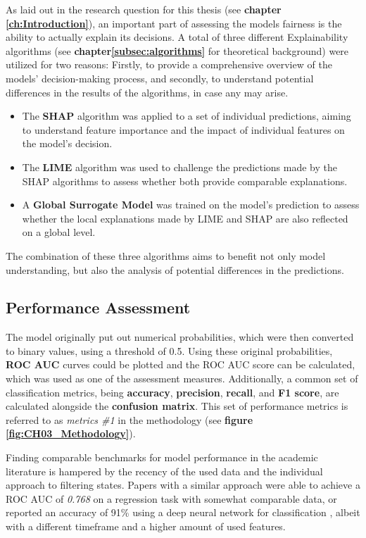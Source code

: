 As laid out in the research question for this thesis (see \textbf{chapter \ref{ch:Introduction}}), an important part of assessing the models fairness is the ability to actually explain its decisions.
A total of three different Explainability algorithms (see \textbf{chapter\ref{subsec:algorithms}} for theoretical background) were utilized for two reasons: Firstly, to provide a comprehensive overview of the models' decision-making process, and secondly, to understand potential differences in the results of the algorithms, in case any may arise.
\begin{itemize}
    \item The \textbf{SHAP} algorithm was applied to a set of individual predictions, aiming to understand feature importance and the impact of individual features on the model's decision.
    \item The \textbf{LIME} algorithm was used to challenge the predictions made by the SHAP algorithms to assess whether both provide comparable explanations.
    \item A \textbf{Global Surrogate Model} was trained on the model's prediction to assess whether the local explanations made by LIME and SHAP are also reflected on a global level.
\end{itemize}
The combination of these three algorithms aims to benefit not only model understanding, but also the analysis of potential differences in the predictions.

\subsection{Performance Assessment}\label{subsec:Performance_Assessment}

The model originally put out numerical probabilities, which were then converted to binary values, using a threshold of 0.5.
Using these original probabilities, \textbf{ROC AUC} curves could be plotted and the ROC AUC score can be calculated, which was used as one of the assessment measures.
Additionally, a common set of classification metrics, being \textbf{accuracy}, \textbf{precision}, \textbf{recall}, and \textbf{F1 score}, are calculated alongside the \textbf{confusion matrix}.
This set of performance metrics is referred to as \textit{metrics \#1} in the methodology (see \textbf{figure \ref{fig:CH03_Methodology}}).

Finding comparable benchmarks for model performance in the academic literature is hampered by the recency of the used data and the individual approach to filtering states.
Papers with a similar approach were able to achieve a ROC AUC of \textit{0.768} on a regression task \parencite{Ghoba} with somewhat comparable data, 
or reported an accuracy of 91\% using a deep neural network for classification \parencite{Hodges2024}, albeit with a different timeframe and a higher amount of used features. 

